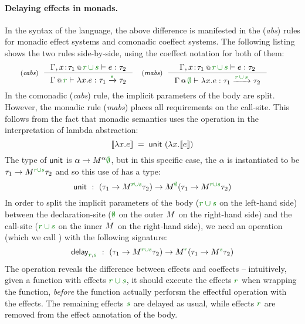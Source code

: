 \paragraph{Delaying effects in monads.} 
In the syntax of the language, the above difference is manifested in the (\emph{abs}) rules for 
monadic effect systems and comonadic coeffect systems. The following listing shows the two rules 
side-by-side, using the coeffect notation for both of them:
%
\begin{equation*}
\tyrule{cabs}
  { \coctx{\Gamma, x\!:\!\tau_1}{\cclrd{r}\,\cclrd{\cup}\,\cclrd{s}} \vdash e : \tau_2 }
  { \coctx{\Gamma}{\cclrd{r}} \vdash \lambda x.e : \tau_1 \xrightarrow{\cclrd{s}} \tau_2 }
\quad
\tyrule{mabs}
  { \coctx{\Gamma, x\!:\!\tau_1}{\cclrd{r}\,\cclrd{\cup}\,\cclrd{s}} \vdash e : \tau_2 }
  { \coctx{\Gamma}{\cclrd{\emptyset}} \vdash \lambda x.e : \tau_1 \xrightarrow{\cclrd{r}\,\cclrd{\cup}\,\cclrd{s}} \tau_2 }
\qquad
\end{equation*}
%
In the comonadic (\emph{cabs}) rule, the implicit parameters of the body are split. However,
the monadic rule (\emph{mabs}) places all requirements on the call-site. This follows from the
fact that monadic semantics uses the  operation in the interpretation of lambda abstraction:
%
\begin{equation*}
\sem{\lambda x.e} \;=\; \ident{unit}~(\lambda x. \sem{e})
\end{equation*}
%
The type of $\textnormal{\sffamily unit}$ is $\alpha\rightarrow\mtyp{\alpha}{\cclrd{\emptyset}}$, but in this specific
case, the $\alpha$ is instantiated to be $\tau_1\rightarrow\mtyp{\cclrd{r \cup s}}{\tau_2}$ and so this
use of  has a type:
%
\begin{equation*}
\ident{unit}~:~(\tau_1\rightarrow\mtyp{\cclrd{r \cup s}}{\tau_2}) \rightarrow \mtyp{\cclrd{\emptyset}}(\tau_1\rightarrow\mtyp{\cclrd{r \cup s}}{\tau_2})
\end{equation*}
%
In order to split the implicit parameters of the body ($\cclrd{r \cup s}$ on the left-hand side) between 
the declaration-site ($\cclrd{\emptyset}$ on the outer $\mtyp{}$ on the right-hand side) and the 
call-site ($\cclrd{r \cup s}$ on the inner $\mtyp{}$ on the right-hand side), we need an operation
(which we call ) with the following signature:
%
\begin{equation*}
\ident{delay}_{\cclrd{r}, \cclrd{s}}~:~(\tau_1\rightarrow\mtyp{\cclrd{r \cup s}}{\tau_2}) \rightarrow \mtyp{\cclrd{r}}(\tau_1\rightarrow\mtyp{\cclrd{s}}{\tau_2})
\end{equation*}
%
The operation reveals the difference between effects and coeffects -- intuitively, given a function
with effects $\cclrd{r \cup s}$, it should execute the effects $\cclrd{r}$ when wrapping the 
function, \emph{before} the function actually perforsm the effectful operation with the effects.
The remaining effects $\cclrd{s}$ are delayed as usual, while effects $\cclrd{r}$ are removed
from the effect annotation of the body.

